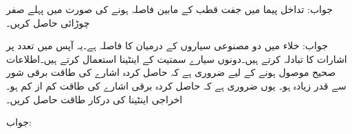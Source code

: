 جواب: 
تداخل پیما میں  جفت قطب کے مابین فاصلہ  ہونے کی صورت میں پہلے صفر چوڑائی حاصل کریں۔

جواب: 
خلاء میں دو مصنوعی سیاروں  کے درمیان  کا فاصلہ ہے۔یہ آپس میں  تعدد پر اشارات کا تبادلہ  کرتے ہیں۔دونوں سیارے  سمتیت  کے اینٹینا استعمال کرتے ہیں۔اطلاعات صحیح موصول ہونے کے لیے ضروری ہے کہ حاصل کردہ اشارے کی طاقت  برقی شور سے قدر زیادہ ہو۔ یوں ضروری ہے کہ حاصل کردہ برقی اشارے کی طاقت کم از کم  ہو۔ اخراجی اینٹینا کی درکار طاقت حاصل کریں۔

جواب:
